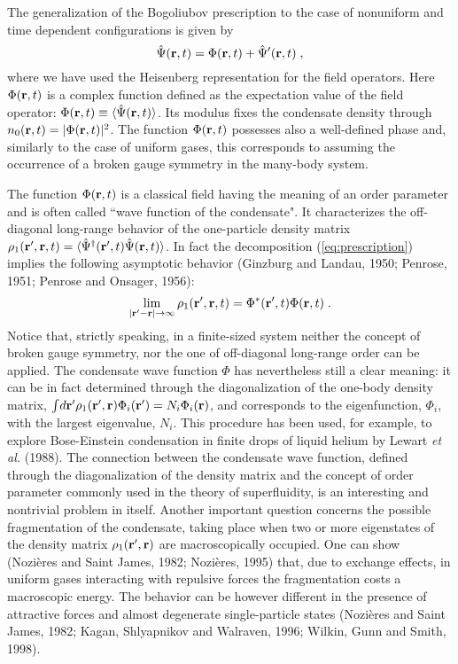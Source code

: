 The generalization of the Bogoliubov prescription to the case of  
nonuniform and time dependent configurations is given by
\begin{equation}
\hat \Psi ({\bf r},t) = \Phi ({\bf r},t) + \hat\Psi' ({\bf r},t) 
\; ,
\label{eq:prescription}
\end{equation}
where we have used the Heisenberg representation for the field operators.
Here $\Phi({\bf r},t)$ is a complex function defined as the expectation
value of the field operator: $\Phi({\bf r},t) \equiv  \langle \hat{\Psi}
({\bf r},t)\rangle$. Its modulus fixes the condensate density through 
$n_0({\bf r},t)=|\Phi({\bf r},t)|^2$. The function $\Phi({\bf r},t)$ 
possesses also a well-defined phase and, similarly to the case of uniform 
gases, this corresponds to assuming the occurrence of a broken gauge 
symmetry in the many-body system.

The function $\Phi({\bf r},t)$ is a classical field having the meaning of 
an order parameter and is often called ``wave function of the condensate". 
It characterizes the off-diagonal long-range behavior of the one-particle 
density matrix $\rho_1({\bf r}',{\bf r},t)= \langle \hat \Psi ^\dagger 
({\bf r}',t) \hat \Psi ({\bf r},t)\rangle $. In fact the decomposition
(\ref{eq:prescription}) implies the following asymptotic behavior
(Ginzburg and Landau, 1950; Penrose, 1951; Penrose and Onsager, 1956):
\begin{equation}
\lim_{|{\bf r}'-{\bf r}|\to\infty}  \rho_1 ({\bf r}',{\bf r},t) =
\Phi ^*({\bf r}',t) \Phi ({\bf r},t) \; .
\label{eq:nondiag}
\end{equation}
Notice that, strictly speaking, in a finite-sized system neither
the concept of broken gauge symmetry, nor the one of off-diagonal
long-range order can be applied. The condensate wave function $\Phi$
has nevertheless still a clear meaning: it can be in fact determined
through  the diagonalization of the one-body density matrix, 
$\int \! d{\bf r}' \rho_1 ({\bf r}',{\bf r}) \Phi_i ({\bf r}') =
N_i \Phi_i ({\bf r})$,  and corresponds to the eigenfunction, $\Phi_i$, 
with the largest eigenvalue, $N_i$. This procedure has been used, for
example, to explore Bose-Einstein condensation in finite drops of
liquid helium by Lewart {\it et al.} (1988).  The connection between 
the condensate wave function, defined through the diagonalization of 
the density matrix and the concept of order parameter commonly used 
in the theory of superfluidity, is an interesting and nontrivial 
problem in itself. Another important question concerns the possible
fragmentation of the condensate, taking place when two or more 
eigenstates of the density matrix $\rho_1 ({\bf r}',{\bf r})$ are
macroscopically occupied. One can show (Nozi\`eres and Saint
James, 1982; Nozi\`eres, 1995) that,  due to exchange effects, in 
uniform gases interacting with repulsive forces the fragmentation costs 
a macroscopic energy. The  behavior can be however different in the 
presence of attractive forces and almost degenerate single-particle 
states (Nozi\`eres and Saint James, 1982; Kagan, Shlyapnikov and 
Walraven, 1996; Wilkin, Gunn and Smith, 1998).


